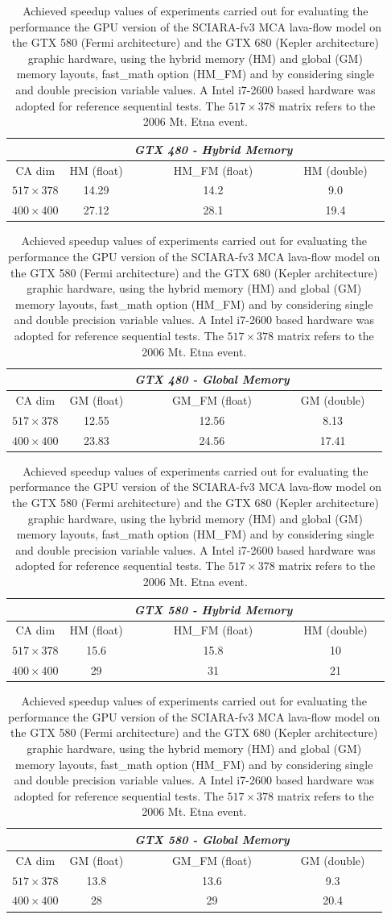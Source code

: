 {\footnotesize
\begin{table}
\caption{Achieved speedup values of experiments carried out for evaluating the
performance the GPU version of the SCIARA-fv3 MCA lava-flow model on the GTX 580 (Fermi architecture) and the GTX 680 (Kepler architecture) graphic hardware, using the hybrid  memory (HM) and global (GM) memory layouts, fast\_math option (HM\_FM) and by considering single and double precision variable values. A Intel i7-2600 based hardware was adopted for reference sequential tests. The $517 \times 378$ matrix refers to the 2006 Mt. Etna event.} \center
\label{tab:execGM_HM}
\begin{center}

\begin{tabular}{ccccc}
& & \textit{GTX 480 - Hybrid Memory} & &\\
\hline
CA dim &   HM (float) & HM\_FM (float) & HM (double)\\
\hline
$517 \times 378 $ & 14.29 & 14.2 &  9.0  \\
$400 \times 400 $ & 27.12 & 28.1 & 19.4  \\
\hline
\end{tabular}

\vspace{10pt}

\begin{tabular}{ccccc}
& & \textit{GTX 480 - Global Memory} & &\\
\hline
CA dim &   GM (float) & GM\_FM (float) & GM (double)\\
\hline
$517 \times 378$ & 12.55 & 12.56  & 8.13 \\
$400 \times 400 $ & 23.83 & 24.56 & 17.41 \\
\hline
\end{tabular}

\vspace{20pt}
\begin{tabular}{ccccc}
& & \textit{GTX 580 - Hybrid Memory} & &\\
\hline
CA dim &   HM (float) & HM\_FM (float) & HM (double)\\
\hline
$517 \times 378 $ & 15.6 & 15.8 &  10  \\
$400 \times 400 $ & 29 & 31 & 21  \\
\hline
\end{tabular}

\vspace{10pt}

\begin{tabular}{ccccc}
& & \textit{GTX 580 - Global Memory} & &\\
\hline
CA dim &   GM (float) & GM\_FM (float) & GM (double)\\
\hline
$517 \times 378$ & 13.8 & 13.6  & 9.3 \\
$400 \times 400 $ & 28 & 29 & 20.4 \\
\hline
\end{tabular}


\end{center}
\end{table}}
